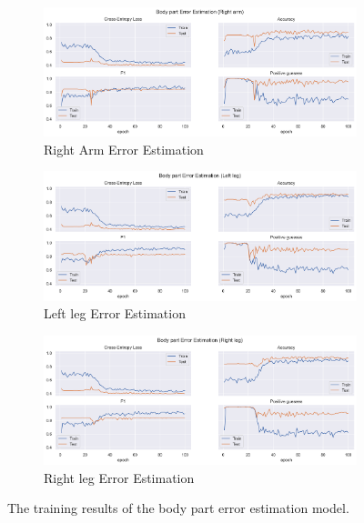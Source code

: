 \begin{figure}[ht]
  \begin{subfigure}[b]{0.9\linewidth}
      \centering
      \includegraphics[width=\textwidth]{figures/Results/v2_bs_40_is_64_e_100/bp/Right arm_ErrorEstimation.png}
      \caption{Right Arm Error Estimation}
      \label{fig:riar_lb_ee}
  \end{subfigure}
  \hfill
  \begin{subfigure}[b]{0.9\linewidth}
      \centering
      \includegraphics[width=\textwidth]{figures/Results/v2_bs_40_is_64_e_100/bp/Left leg_ErrorEstimation.png}
      \caption{Left leg Error Estimation}
      \label{fig:lele_lb_ee}
  \end{subfigure}
  \hfill
  \begin{subfigure}[b]{0.9\linewidth}
      \centering
      \includegraphics[width=\textwidth]{figures/Results/v2_bs_40_is_64_e_100/bp/Right leg_ErrorEstimation.png}
      \caption{Right leg Error Estimation}
      \label{fig:rileg_lb_ee}
  \end{subfigure}
  \hfill
  \caption[Limb model training results]{The training results of the body part error estimation model.}
  \label{fig:body part_training_results}
\end{figure}

